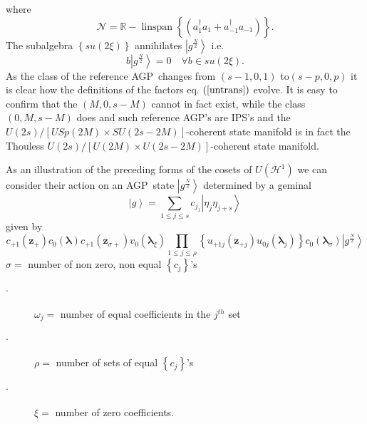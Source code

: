\documentclass[aps,preprint]{revtex4}%
\begin{document}
where
\begin{equation}
\mathcal{N}=\mathbb{R-}\operatorname{linspan}\left\{  \left(  a_{1}^{\dagger
}a_{1}+a_{-1}^{\dagger}a_{-1}\right)  \right\}  .
\end{equation}
The subalgebra $\left\{  su\left(  2\xi\right)  \right\}  $ annihilates
$\left\vert g^{\frac{N}{2}}\right\rangle $ i.e.
\begin{equation}
b\left\vert g^{\frac{N}{2}}\right\rangle =0\quad\forall b\in su\left(
2\xi\right)  .
\end{equation}
As the class of the reference AGP\ changes from $\left(  s-1,0,1\right)  $
to$\left(  s-p,0,p\right)  $ it is clear how the definitions of the factors
eq. $\left(  \ref{untrans}\right)  $ evolve. It is easy to confirm that the
$\left(  M,0,s-M\right)  $ cannot in fact exist, while the class $\left(
0,M,s-M\right)  $ does and such reference AGP's are IPS's and the $U\left(
2s\right)  /\left[  USp\left(  2M\right)  \times SU\left(  2s-2M\right)
\right]  $-coherent state manifold is in fact the Thouless $U\left(
2s\right)  /\left[  U\left(  2M\right)  \times U\left(  2s-2M\right)  \right]
$-coherent state manifold.

As an illustration of the preceding forms of the cosets of $U\left(
\mathcal{H}^{1}\right)  $ we can consider their action on an AGP\ state
$\left\vert g^{\frac{N}{2}}\right\rangle $ determined by a geminal
\begin{equation}
\left\vert g\right\rangle =\sum_{1\leq j\leq s}c_{j_{1}}\left\vert \eta
_{j}\eta_{j+s}\right\rangle
\end{equation}
given by
\begin{equation}
c_{+1}\left(  \mathbf{z}_{+}\right)  c_{0}\left(  \mathbf{\lambda}\right)
c_{+1}\left(  \mathbf{z}_{\sigma+}\right)  v_{0}\left(  \mathbf{\lambda}_{\xi
}\right)
{\textstyle\prod_{1\leq j\leq\rho}}
\left\{  u_{+1j}\left(  \mathbf{z}_{+j}\right)  u_{0j}\left(  \mathbf{\lambda
}_{j}\right)  \right\}  c_{0}\left(  \mathbf{\lambda}_{\sigma}\right)
\left\vert g^{\frac{N}{2}}\right\rangle
\end{equation}
$\sigma=$ number of non zero, non equal $\left\{  c_{j}\right\}  $'s

\begin{description}
\item[$\cdot$] $\omega_{j}=$ number of equal coefficients in the $j^{th}$ set

\item[$\cdot$] $\rho=$ number of sets of equal $\left\{  c_{j}\right\}  $'s

\item[$\cdot$] $\xi=$ number of zero coefficients.
\end{description}
\end{document}
